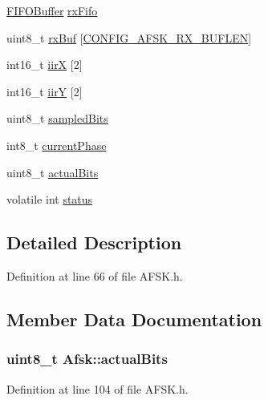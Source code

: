 \begin{DoxyCompactItemize}
\item 
\hyperlink{struct_f_i_f_o_buffer}{F\+I\+F\+O\+Buffer} \hyperlink{struct_afsk_ac37f5dab53ed2219bbfc0d4c3f2f25b8}{rx\+Fifo}
\item 
uint8\+\_\+t \hyperlink{struct_afsk_a8c7ee9d7b92796ccc7c3257b581695cb}{rx\+Buf} \mbox{[}\hyperlink{_a_f_s_k_8h_adb056877043b2fcf1477cf3a69bb89a6}{C\+O\+N\+F\+I\+G\+\_\+\+A\+F\+S\+K\+\_\+\+R\+X\+\_\+\+B\+U\+F\+L\+EN}\mbox{]}
\item 
int16\+\_\+t \hyperlink{struct_afsk_a02560c20963adab17b0706c8c69f2ed3}{iirX} \mbox{[}2\mbox{]}
\item 
int16\+\_\+t \hyperlink{struct_afsk_a454754399c47bf3514ffc495832b5391}{iirY} \mbox{[}2\mbox{]}
\item 
uint8\+\_\+t \hyperlink{struct_afsk_af07324b473ed86d0f79b539d0e76ed8c}{sampled\+Bits}
\item 
int8\+\_\+t \hyperlink{struct_afsk_a109e9e878c62839db0f611c8c636ba93}{current\+Phase}
\item 
uint8\+\_\+t \hyperlink{struct_afsk_a6f734e90f74a1efd094c9cde6ea9df6d}{actual\+Bits}
\item 
volatile int \hyperlink{struct_afsk_a4b90678865e08c02384199c6b10aa5b5}{status}
\end{DoxyCompactItemize}


\subsection{Detailed Description}


Definition at line 66 of file A\+F\+S\+K.\+h.



\subsection{Member Data Documentation}
\subsubsection[{\texorpdfstring{actual\+Bits}{actualBits}}]{\setlength{\rightskip}{0pt plus 5cm}uint8\+\_\+t Afsk\+::actual\+Bits}\hypertarget{struct_afsk_a6f734e90f74a1efd094c9cde6ea9df6d}{}\label{struct_afsk_a6f734e90f74a1efd094c9cde6ea9df6d}


Definition at line 104 of file A\+F\+S\+K.\+h.

